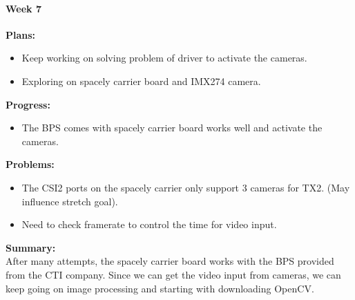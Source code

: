 \paragraph{Week 7}
\begin{adjustwidth}{2.5em}{0pt}
    \vspace{-0.5cm}\textbf{Plans:}
    \vspace{-0.5cm}
    \begin{itemize}
        \item Keep working on solving problem of driver to activate the cameras. 
        \item Exploring on spacely carrier board and IMX274 camera.
    \end{itemize} 
    \vspace{-0.3cm}\textbf{Progress:}
    \vspace{-0.5cm}
    \begin{itemize}
        \item The BPS comes with spacely carrier board works well and activate the cameras.
    \end{itemize} 
    \vspace{-0.3cm}\textbf{Problems:}
    \vspace{-0.5cm}
    \begin{itemize}
        \item The CSI2 ports on the spacely carrier only support 3 cameras for TX2. (May influence stretch goal). 
        \item Need to check framerate to control the time for video input.
    \end{itemize}  
    \vspace{-0.3cm}\noindent\textbf{Summary:}\\
    \noindent After many attempts, the spacely carrier board works with the BPS provided from the CTI 
    company. Since we can get the video input from cameras, we can keep going on image processing and 
    starting with downloading OpenCV. \\
\end{adjustwidth}

